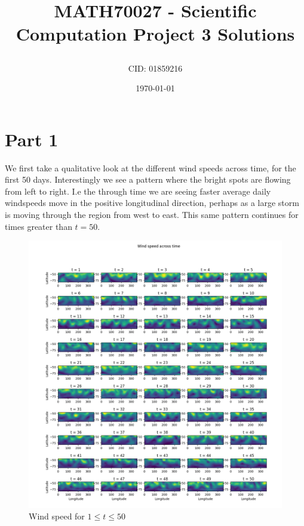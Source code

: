 \documentclass[a4paper, oneside]{book}
\title{MATH70027 - Scientific Computation Project 3 Solutions\author{CID: 01859216}\date{\today}}
\begin{document}
\maketitle
\section*{Part 1}
We first take a qualitative look at the different wind speeds across time, for the first 50 days.
Interestingly we see a pattern where the bright spots are flowing from left to right. 
I.e the through time we are seeing faster average daily windspeeds move in the positive
longitudinal direction, perhaps as a large storm is moving through the region from west
to east. This same pattern continues for times greater than $t=50$.

\begin{figure}[htpb]
    \centering
    \includegraphics[width=1.0\textwidth]{./images/Pasted image 20231205152803.png}
    \caption{Wind speed for $1 \le t \le 50$}
\end{figure}
\end{document}
